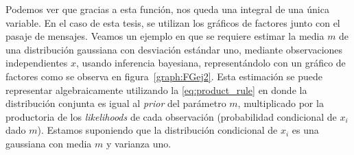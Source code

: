 \documentclass[11pt,twoside,spanish]{report} %
\begin{document}
Podemos ver que gracias a esta funci\'on, nos queda una integral de una \'unica variable.
%
En el caso de esta tesis, se utilizan los gr\'aficos de factores junto con el pasaje de mensajes.
Veamos un ejemplo en que se requiere estimar  la media $m$ de una distribuci\'on gaussiana con desviaci\'on est\'andar uno, mediante observaciones independientes $x$, usando inferencia bayesiana, represent\'andolo con un gr\'afico de factores como se observa en figura~\ref{graph:FGej2}. 
Esta estimaci\'on se puede representar algebraicamente utilizando la \ref{eq:product_rule} en donde la distribuci\'on conjunta es igual al \textit{prior} del par\'ametro $m$, multiplicado por la productoria de los \emph{likelihoods} de cada observaci\'on (probabilidad condicional de $x_i$ dado $m$).
Estamos suponiendo que la distribuci\'on condicional de $x_i$ es una gaussiana con media $m$ y varianza uno.
\end{document}
